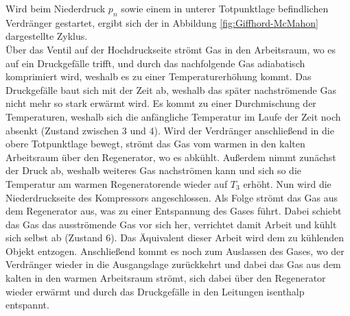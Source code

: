 \documentclass[parskip=half, a4paper,twoside,final]{article}
\begin{document}
Wird beim Niederdruck $p_n$ sowie einem in unterer Totpunktlage befindlichen Verdränger gestartet, ergibt sich der in Abbildung \ref{fig:Giffhord-McMahon} dargestellte Zyklus. \\
Über das Ventil auf der Hochdruckseite strömt Gas in den Arbeitsraum, wo es auf ein Druckgefälle trifft, und durch das nachfolgende Gas adiabatisch komprimiert wird, weshalb es zu einer Temperaturerhöhung kommt. Das Druckgefälle baut sich mit der Zeit ab, weshalb das später nachströmende Gas nicht mehr so stark erwärmt wird. Es kommt zu einer Durchmischung der Temperaturen, weshalb sich die anfängliche Temperatur im Laufe der Zeit noch absenkt (Zustand zwischen 3 und 4). Wird der Verdränger anschließend in die obere Totpunktlage bewegt, strömt das Gas vom warmen in den kalten Arbeitsraum  über den Regenerator, wo es abkühlt. Außerdem nimmt zunächst der Druck ab, weshalb weiteres Gas nachströmen kann und sich so die Temperatur am warmen Regeneratorende wieder auf $T_3$ erhöht. Nun wird die Niederdruckseite des Kompressors angeschlossen. Als Folge strömt das Gas aus dem Regenerator aus, was zu einer Entspannung des Gases führt. Dabei schiebt das Gas das ausströmende Gas vor sich her, verrichtet damit Arbeit und kühlt sich selbst ab (Zustand 6). Das Äquivalent dieser Arbeit wird dem zu kühlenden Objekt entzogen. Anschließend kommt es noch zum Auslassen des Gases, wo der Verdränger wieder in die Ausgangslage zurückkehrt und dabei das Gas aus dem kalten in den warmen Arbeitsraum strömt, sich dabei über den Regenerator wieder erwärmt und durch das Druckgefälle in den Leitungen isenthalp entspannt.
\end{document}
